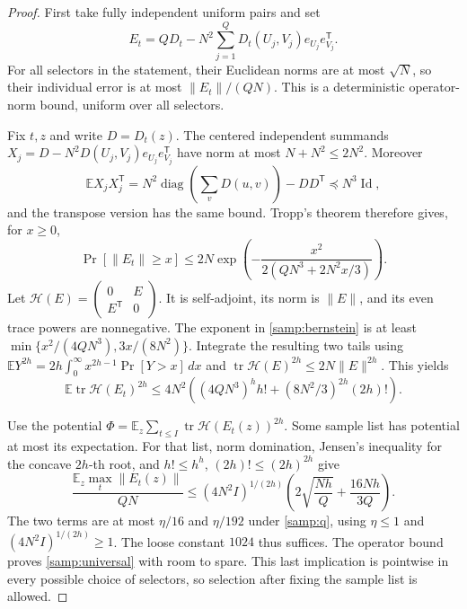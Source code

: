 \documentclass[11pt,letterpaper]{article}
\theoremstyle{definition}
\theoremstyle{remark}
\newcommand{\E}{\mathbb E}
\newcommand{\tr}{\operatorname{tr}}
\newcommand{\diag}{\operatorname{diag}}
\begin{document}
\begin{proof}
First take fully independent uniform pairs and set
\[
E_t=QD_t-N^2\sum_{j=1}^Q
             D_t(U_j,V_j)e_{U_j}e_{V_j}^{\mathsf T}.
\]
For all selectors in the statement, their Euclidean norms are at most
$\sqrt N$, so their individual error is at most $\|E_t\|/(QN)$.
This is a deterministic operator-norm bound, uniform over all selectors.

Fix $t,z$ and write $D=D_t(z)$. The centered independent summands
$X_j=D-N^2D(U_j,V_j)e_{U_j}e_{V_j}^{\mathsf T}$ have norm at most
$N+N^2\le2N^2$. Moreover
\[
\E X_jX_j^{\mathsf T}
=N^2\diag\!\left(\sum_vD(u,v)\right)-DD^{\mathsf T}
\preceq N^3\operatorname{Id},
\]
and the transpose version has the same bound. Tropp's theorem therefore
gives, for $x\ge0$,
\begin{equation}
\Pr[\|E_t\|\ge x]
\le2N\exp\!\left(-\frac{x^2}{2(QN^3+2N^2x/3)}\right).
\label{samp:bernstein}
\end{equation}
Let $\mathcal H(E)=\begin{pmatrix}0&E\\E^{\mathsf T}&0\end{pmatrix}$.
It is self-adjoint, its norm is $\|E\|$, and its even trace powers are
nonnegative. The exponent in \cref{samp:bernstein} is at least
$\min\{x^2/(4QN^3),3x/(8N^2)\}$. Integrate the resulting two tails
using $\E Y^{2h}=2h\int_0^\infty x^{2h-1}\Pr[Y>x]\,dx$ and
$\tr\mathcal H(E)^{2h}\le2N\|E\|^{2h}$. This yields
\begin{equation}
\E\tr\mathcal H(E_t)^{2h}
\le4N^2\left((4QN^3)^h h!
              +(8N^2/3)^{2h}(2h)!\right).
\label{samp:trace-bound}
\end{equation}

Use the potential
$\Phi=\E_z\sum_{t\le I}\tr\mathcal H(E_t(z))^{2h}$.
Some sample list has potential at most its expectation. For that list,
norm domination, Jensen's inequality for the concave $2h$-th root,
and $h!\le h^h$, $(2h)!\le(2h)^{2h}$ give
\begin{equation}
\frac{\E_z\max_t\|E_t(z)\|}{QN}
\le(4N^2I)^{1/(2h)}
       \left(2\sqrt{\frac{Nh}{Q}}+\frac{16Nh}{3Q}\right).
\label{samp:root}
\end{equation}
The two terms are at most $\eta/16$ and $\eta/192$ under
\cref{samp:q}, using $\eta\le1$ and $(4N^2I)^{1/(2h)}\ge1$.
The loose constant $1024$ thus suffices. The operator bound proves
\cref{samp:universal} with room to spare. This last implication is
pointwise in every possible choice of selectors, so selection after
fixing the sample list is allowed.
\end{proof}
\end{document}
